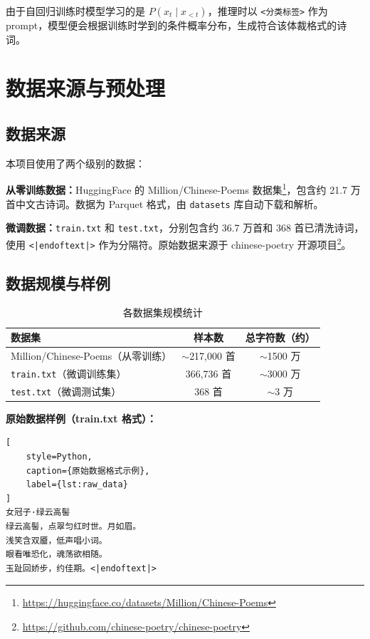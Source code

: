 \documentclass[a4paper, 12pt, centering, AutoFakeBold]{article}
\begin{document}
由于自回归训练时模型学习的是 $P(x_t \mid x_{<t})$，推理时以 \texttt{<分类标签>} 作为 prompt，模型便会根据训练时学到的条件概率分布，生成符合该体裁格式的诗词。

\section{数据来源与预处理}

\subsection{数据来源}

本项目使用了两个级别的数据：

\textbf{从零训练数据：}HuggingFace 的 Million/Chinese-Poems 数据集\footnote{\url{https://huggingface.co/datasets/Million/Chinese-Poems}}，包含约 21.7 万首中文古诗词。数据为 Parquet 格式，由 \texttt{datasets} 库自动下载和解析。

\textbf{微调数据：}\texttt{train.txt} 和 \texttt{test.txt}，分别包含约 36.7 万首和 368 首已清洗诗词，使用 \texttt{<|endoftext|>} 作为分隔符。原始数据来源于 chinese-poetry 开源项目\footnote{\url{https://github.com/chinese-poetry/chinese-poetry}}。

\subsection{数据规模与样例}

\begin{table}[H]
\centering
\caption{各数据集规模统计}
\label{tab:data_scale}
\begin{tabular}{|l|c|c|}
\hline
\textbf{数据集} & \textbf{样本数} & \textbf{总字符数（约）} \\
\hline
Million/Chinese-Poems（从零训练） & $\sim$217,000 首 & $\sim$1500 万 \\
\texttt{train.txt}（微调训练集） & 366,736 首 & $\sim$3000 万 \\
\texttt{test.txt}（微调测试集） & 368 首 & $\sim$3 万 \\
\hline
\end{tabular}
\end{table}

\textbf{原始数据样例（train.txt 格式）：}

\begin{lstlisting}[
    style=Python,
    caption={原始数据格式示例},
    label={lst:raw_data}
]
女冠子·绿云高髻
绿云高髻，点翠匀红时世。月如眉。
浅笑含双靥，低声唱小词。
眼看唯恐化，魂荡欲相随。
玉趾回娇步，约佳期。<|endoftext|>
\end{lstlisting}
\end{document}
